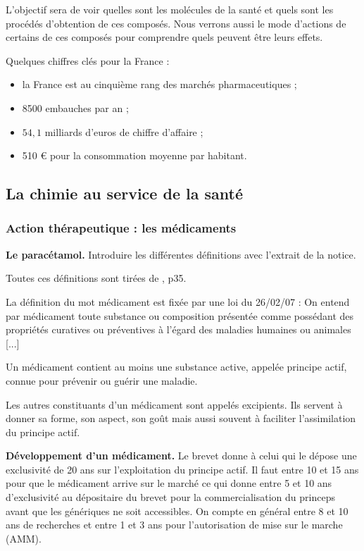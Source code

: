 L'objectif sera de voir quelles sont les molécules de la santé et quels sont les procédés d'obtention de ces composés.
Nous verrons aussi le mode d'actions de certains de ces composés pour comprendre quels peuvent être leurs effets.

\begin{remarque}
Quelques chiffres clés pour la France \cite{Guidepharmasante} :
\begin{itemize}
\item la France est au cinquième rang des marchés pharmaceutiques ;
\item 8500 embauches par an ;
\item $54{,}1$ milliards d'euros de chiffre d'affaire ;
\item 510 \euro{} pour la consommation moyenne par habitant.
\end{itemize}
\end{remarque}

\subsection{La chimie au service de la santé}

\subsubsection{Action thérapeutique : les médicaments}

\begin{slide}
\textbf{Le paracétamol.}
Introduire les différentes définitions avec l'extrait de la notice.
\end{slide}

Toutes ces définitions sont tirées de \cite{Prevost2017}, p35.

La définition du mot médicament est fixée par une loi du 26/02/07 : \og On entend par médicament toute substance ou composition présentée comme possédant des propriétés curatives ou préventives à l'égard des maladies humaines ou animales [...] \fg{}

Un médicament contient au moins une substance active, appelée principe actif, connue pour prévenir ou guérir une maladie.

Les autres constituants d'un médicament sont appelés excipients.
Ils servent à donner sa forme, son aspect, son goût mais aussi souvent à faciliter l'assimilation du principe actif.

\begin{slide}
\textbf{Développement d'un médicament.}
Le brevet donne à celui qui le dépose une exclusivité de 20 ans sur l'exploitation du principe actif.
Il faut entre 10 et 15 ans pour que le médicament arrive sur le marché ce qui donne entre 5 et 10 ans d'exclusivité au dépositaire du brevet pour la commercialisation du princeps avant que les génériques ne soit accessibles.
On compte en général entre 8 et 10 ans de recherches et entre 1 et 3 ans pour l'autorisation de mise sur le marche (AMM).
\end{slide}

